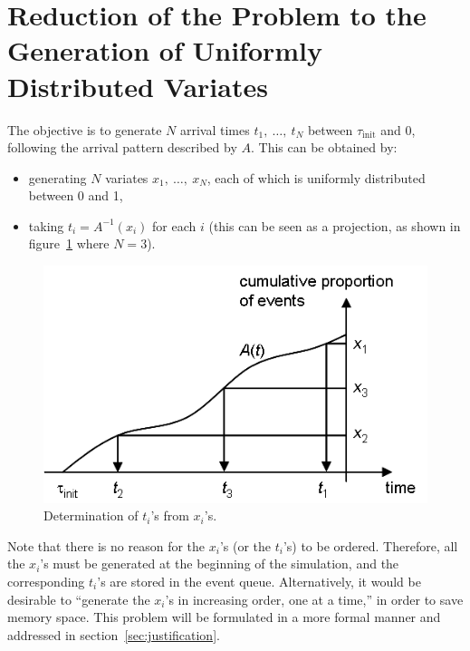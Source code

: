 \documentclass[12pt]{article} %
\begin{document}
\section{Reduction of the Problem to the Generation of Uniformly Distributed Variates}
%
The objective is to generate $N$ arrival times $t_1,\ \ldots,\ t_N$ between $\tau_\text{init}$ and 0, following the arrival pattern described by $A$. This can be obtained by:
\begin{itemize}
\item generating $N$ variates $x_1,\ \ldots,\ x_N$, each of which is uniformly distributed between 0 and 1,
\item taking $t_i = A^{-1}(x_i)$ for each $i$ (this can be seen as a projection, as shown in figure~\ref{fig:projection} where $N=3$).
\end{itemize}
\begin{figure}[ht]
\centering
\includegraphics{projection}
\vspace{-4mm}
\caption{Determination of $t_i$'s from $x_i$'s.}
\label{fig:projection}
\end{figure}
Note that there is no reason for the $x_i$'s (or the $t_i$'s) to be ordered. Therefore, all the $x_i$'s must be generated at the beginning of the simulation, and the corresponding $t_i$'s are stored in the event queue. Alternatively, it would be desirable to ``generate the $x_i$'s in increasing order, one at a time,'' in order to save memory space. This problem will be formulated in a more formal manner and addressed in section~\ref{sec:justification}.
%
%
\end{document}
